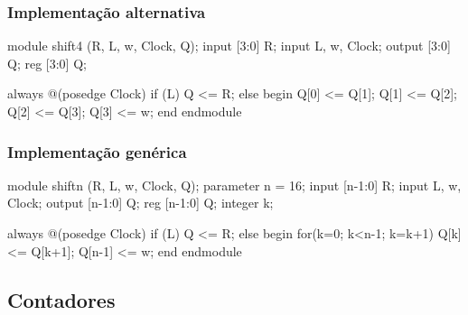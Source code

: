 \begin{frame}[fragile]
	\frametitle{Implementação alternativa}
	\begin{verilogcode}
module shift4 (R, L, w, Clock, Q); 
  input [3:0] R;
  input L, w, Clock;
  output [3:0] Q;
  reg [3:0] Q;

  always @(posedge Clock) 
    if (L)
      Q <= R; 
    else
    begin
      Q[0] <= Q[1]; 
      Q[1] <= Q[2]; 
      Q[2] <= Q[3]; 
      Q[3] <= w;
    end 
endmodule
	\end{verilogcode}
\end{frame}


\begin{frame}[fragile]
	\frametitle{Implementação genérica}
	\begin{verilogcode}
module shiftn (R, L, w, Clock, Q); 
  parameter n = 16;
  input [n-1:0] R;
  input L, w, Clock;
  output [n-1:0] Q; 
  reg [n-1:0] Q; 
  integer k;

  always @(posedge Clock) 
    if (L)
      Q <= R; 
    else
    begin
      for(k=0; k<n-1; k=k+1)
        Q[k] <= Q[k+1]; 
      Q[n-1] <= w;
    end 
endmodule
	\end{verilogcode}
\end{frame}

\subsection{Contadores}


